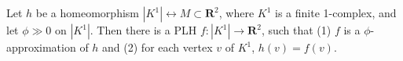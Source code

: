 Let $h$ be a homeomorphism $|K^1| \leftrightarrow M \subset \mathbf{R}^2$, where $K^1$ is a finite 1-complex, and let $\phi \gg 0$ on $|K^1|$. Then there is a PLH $f: |K^1| \rightarrow \mathbf{R}^2$, such that (1) $f$ is a $\phi$-approximation of $h$ and (2) for each vertex $v$ of $K^1$, $h(v) = f(v)$.

